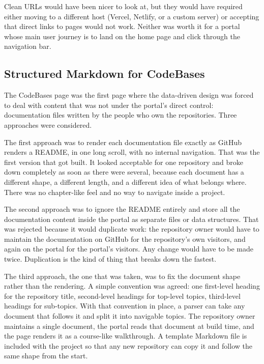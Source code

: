 Clean URLs would have been nicer to look at, but they would have required either moving to a different host (Vercel, Netlify, or a custom server) or accepting that direct links to pages would not work. Neither was worth it for a portal whose main user journey is to land on the home page and click through the navigation bar.

\subsection{Structured Markdown for CodeBases}\label{subsec:dev-design-markdown}

The CodeBases page was the first page where the data-driven design was forced to deal with content that was not under the portal's direct control: documentation files written by the people who own the repositories. Three approaches were considered.

The first approach was to render each documentation file exactly as GitHub renders a README, in one long scroll, with no internal navigation. That was the first version that got built. It looked acceptable for one repository and broke down completely as soon as there were several, because each document has a different shape, a different length, and a different idea of what belongs where. There was no chapter-like feel and no way to navigate inside a project.

The second approach was to ignore the README entirely and store all the documentation content inside the portal as separate files or data structures. That was rejected because it would duplicate work: the repository owner would have to maintain the documentation on GitHub for the repository's own visitors, and again on the portal for the portal's visitors. Any change would have to be made twice. Duplication is the kind of thing that breaks down the fastest.

The third approach, the one that was taken, was to fix the document shape rather than the rendering. A simple convention was agreed: one first-level heading for the repository title, second-level headings for top-level topics, third-level headings for sub-topics. With that convention in place, a parser can take any document that follows it and split it into navigable topics. The repository owner maintains a single document, the portal reads that document at build time, and the page renders it as a course-like walkthrough. A template Markdown file is included with the project so that any new repository can copy it and follow the same shape from the start.

